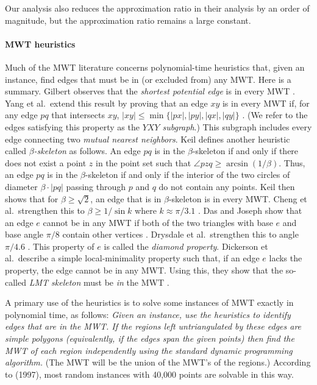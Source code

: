 \documentclass[final]{siamltex}
\renewcommand{\overline}[1]{{#1}}
\newcommand{\edge}{e}
\newcommand{\YXY}{YXY\xspace}
\begin{document}
Our analysis also reduces the approximation ratio in their analysis by an order of magnitude, 
but the approximation ratio remains a large constant.

\paragraph{MWT heuristics}
Much of the MWT literature concerns polynomial-time heuristics that, given an instance, 
find edges that must be in (or excluded from) any MWT.
Here is a summary.
Gilbert observes that the {\em shortest potential edge} is in every MWT \cite{gilbert1979new}.
Yang et al.~extend this result by proving that an edge $\overline{xy}$ is in every MWT 
if, for any edge $\overline{pq}$ that intersects $\overline{xy}$,
$|\overline{xy}| \le \min\{|\overline{px}|,|\overline{py}|,|\overline{qx}|,|\overline{qy}|\}$ \cite{yang1994chain}.
(We refer to the edges satisfying this property as the {\em $\YXY$ subgraph}.)
This subgraph includes every edge connecting two {\em mutual nearest neighbors}. 
Keil \cite{keil1994computing} defines another heuristic called {\em $\beta$-skeleton} as follows. 
An edge $\overline{p q}$ is in the $\beta$-skeleton if and only if there does not exist a point $z$
in the point set such that $\angle p z q \ge \arcsin(1/\beta)$. 
Thus, an edge $\overline{p q}$ is in the $\beta$-skeleton if and only if 
the interior of the two circles of diameter 
$\beta\cdot|{\overline{p q}}|$ passing through $p$ and $q$ do not contain any points.
Keil \cite{keil1994computing} then shows that for $\beta \ge \sqrt{2}$, an edge that is in 
$\beta$-skeleton is in every MWT. 
Cheng et al.~strengthen this to $\beta \ge 1/\sin k $ where $k \approx \pi/3.1$ \cite{cheng1996approaching}.
Das and Joseph show that an edge $\edge$ cannot be in any MWT if
both of the two triangles with base $\edge$ and base angle $\pi/8$ 
contain other vertices \cite{das1989triangulations}. 
Drysdale et al.~strengthen this to angle $\pi/4.6$ \cite{drysdale2001exclusion}.
This property of $\edge$ is called the {\em diamond property}.
Dickerson et al.~describe a simple local-minimality property such that,
if an edge $\edge$ lacks the property,
the edge cannot be in any MWT.
Using this, they show that the so-called
{\em LMT skeleton} must be {\em in} the MWT
\cite{dickerson1997large}.

A primary use of the heuristics is to solve
some instances of MWT exactly in polynomial time, as follows:
{\em Given an instance, use the heuristics to identify edges that are in the MWT.
If the regions left untriangulated by these edges are simple polygons
(equivalently, if the edges span the given points)
then find the MWT of each region independently
using the standard dynamic programming algorithm.}
(The MWT will be the union of the MWT's of the regions.)
According to \cite{dickerson1997large} (1997),
most random instances with 40,000 points are solvable in this way.
\end{document}
